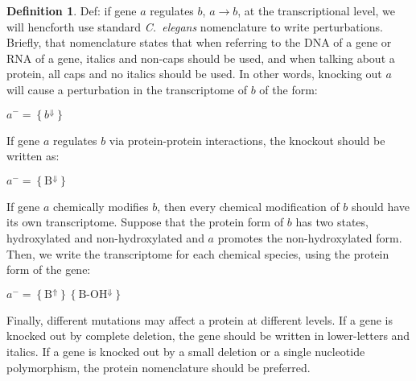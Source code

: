 \documentclass{article}
\newcommand{\transcr}[1]{\left \{ #1 \right \}}
\theoremstyle{definition}
\newtheorem{definition}{Definition}[section]
\begin{document}
\begin{definition}
  Def: if gene $a$ regulates $b$, $a \rightarrow b$, at the transcriptional level, we will hencforth use standard \emph{C.~elegans} nomenclature to write perturbations. Briefly, that nomenclature states that when referring to the DNA of a gene or RNA of a gene, italics and non-caps should be used, and when talking about a protein, all caps and no italics should be used. In other words, knocking out $a$ will cause a perturbation in the transcriptome of $b$ of the form:

  $a^-=\transcr{b^\Downarrow}$

  If gene $a$ regulates $b$ via protein-protein interactions, the knockout should be written as:

  $a^-=\transcr{\textrm{B}^\Downarrow}$

  If gene $a$ chemically modifies $b$, then every chemical modification of $b$ should have its own transcriptome. Suppose that the protein form of $b$ has two states, hydroxylated and non-hydroxylated and $a$ promotes the non-hydroxylated form. Then, we write the transcriptome for each chemical species, using the protein form of the gene:

  $a^-=\transcr{\textrm{B}^\Uparrow}\transcr{\textrm{B-OH}^\Downarrow}$

  Finally, different mutations may affect a protein at different levels. If a gene is knocked out by complete deletion, the gene should be written in lower-letters and italics. If a gene is knocked out by a small deletion or a single nucleotide polymorphism, the protein nomenclature should be preferred.
\end{definition}

%
%
\end{document}

